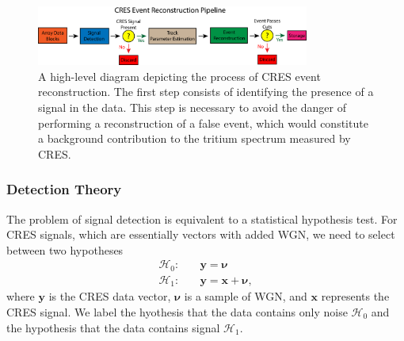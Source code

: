 \begin{figure}[htbp]
    \centering
    \includegraphics[width=0.8\textwidth]{figs/Chapter-4/230108_deepfilter_paper_event_reconstruction_pipeline.png}
    \caption{A high-level diagram depicting the process of CRES event reconstruction. The first step consists of identifying the presence of a signal in the data. This step is necessary to avoid the danger of performing a reconstruction of a false event, which would constitute a background contribution to the tritium spectrum measured by CRES.}
    \label{fig:chap4-pter-pipeline}
\end{figure}

\subsubsection*{Detection Theory}

The problem of signal detection is equivalent to a statistical hypothesis test. For CRES signals, which are essentially vectors with added WGN, we need to select between two hypotheses
\begin{align}
    \mathcal{H}_0:&\quad\bm{y}=\bm{\nu}\\
    \mathcal{H}_1:&\quad\bm{y}=\bm{x}+\bm{\nu},
\end{align}
where $\bm{y}$ is the CRES data vector, $\bm{\nu}$ is a sample of WGN, and $\bm{x}$ represents the CRES signal. We label the hyothesis that the data contains only noise $\mathcal{H}_0$ and the hypothesis that the data contains signal $\mathcal{H}_1$.

